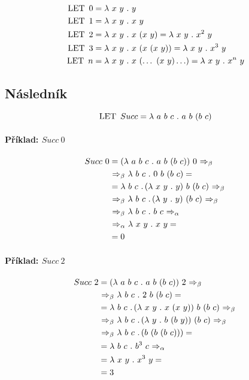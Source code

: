\begin{equation}
    \begin{split}
        \lklet 0 &= \lk x ~ y \lkdot y \\
        \lklet 1 &= \lk x ~ y \lkdot x ~ y \\
        \lklet 2 &= \lk x ~ y \lkdot x ~ (x ~ y) = \lk x ~ y \lkdot x^2 ~ y \\
        \lklet 3 &= \lk x ~ y \lkdot x ~ (x ~ (x ~ y)) = \lk x ~ y \lkdot x^3 ~ y \\
        \lklet n &= \lk x ~ y \lkdot x ~ (\ldots ~ (x ~ y) \ldots ) = \lk x ~ y \lkdot x^n ~ y
    \end{split}
\end{equation}

\subsection{Následník}

$$ \lklet Succ = \lk a ~ b ~ c \lkdot a ~ b ~ (b ~ c) $$

\paragraph*{Příklad: $Succ ~ 0$}
\begin{equation}
    \begin{split}
        Succ ~ 0 &= (\lk a ~ b ~ c \lkdot a ~ b ~ (b ~ c)) ~ 0 \lkbeta \\
        &\lkbeta \lk b ~ c \lkdot 0 ~ b ~ (b ~ c) = \\
        &= \lk b ~ c \lkdot (\lk x ~ y \lkdot y) ~ b ~ (b ~ c) \lkbeta \\
        &\lkbeta \lk b ~ c \lkdot (\lk y \lkdot y) ~ (b ~ c) \lkbeta \\
        &\lkbeta \lk b ~ c \lkdot b ~ c \lkalpha \\
        &\lkalpha\lk x ~ y \lkdot x ~ y = \\
        &= 0
    \end{split}
\end{equation}

\paragraph*{Příklad: $Succ ~ 2$}
\begin{equation}
    \begin{split}
        Succ ~ 2 &= (\lk a ~ b ~ c \lkdot a ~ b ~ (b ~ c)) ~ 2 \lkbeta \\
        &\lkbeta \lk b ~ c \lkdot 2 ~ b ~ (b ~ c) = \\
        &= \lk b ~ c \lkdot (\lk x ~ y \lkdot x ~ (x ~ y)) ~ b ~ (b ~ c) \lkbeta \\
        &\lkbeta \lk b ~ c \lkdot (\lk y \lkdot b ~ (b ~ y)) ~ (b ~ c) \lkbeta \\
        &\lkbeta \lk b ~ c \lkdot (b ~ (b ~ (b ~ c))) = \\
        &= \lk b ~ c \lkdot b^3 ~ c \lkalpha\\
        &= \lk x ~ y \lkdot x^3 ~ y = \\
        &= 3
    \end{split}
\end{equation}

